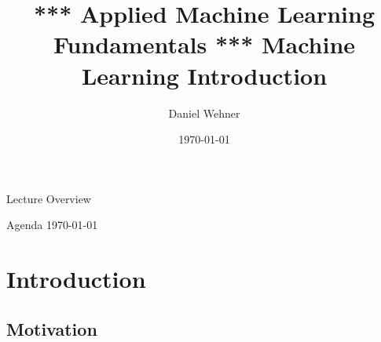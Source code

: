


\title[Machine Learning Introduction]{*** Applied Machine Learning Fundamentals *** Machine Learning Introduction}
\author{Daniel Wehner}
\date{\today}




\maketitlepage


\begin{frame}{Lecture Overview}{}
\end{frame}


\begin{frame}{Agenda \today}
	\begin{multicols}{2}
		\tableofcontents
	\end{multicols}
\end{frame}


\section{Introduction}

\subsection{Motivation}

